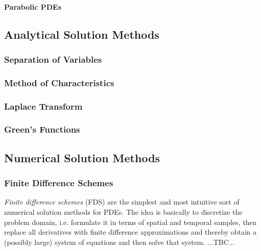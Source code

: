 \paragraph{Parabolic PDEs}





\subsection{Analytical Solution Methods}



\subsubsection{Separation of Variables}


\subsubsection{Method of Characteristics}

\subsubsection{Laplace Transform}

\subsubsection{Green's Functions}





\subsection{Numerical Solution Methods}



\subsubsection{Finite Difference Schemes}
\emph{Finite difference schemes} (FDS) are the simplest and most intuitive sort of numerical solution methods for PDEs. The idea is basically to discretize the problem domain, i.e. formulate it in terms of spatial and temporal samples, then replace all derivatives with finite difference approximations and thereby obtain a (possibly large) system of equations and then solve that system. ...TBC...

